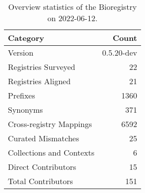 \begin{table}
\centering
\caption{Overview statistics of the Bioregistry on 2022-06-12.}
\label{tab:bioregistry-summary}
\begin{tabular}{lr}
\toprule
                Category &      Count \\
\midrule
                 Version & 0.5.20-dev \\
     Registries Surveyed &         22 \\
      Registries Aligned &         21 \\
                Prefixes &       1360 \\
                Synonyms &        371 \\
 Cross-registry Mappings &       6592 \\
      Curated Mismatches &         25 \\
Collections and Contexts &          6 \\
     Direct Contributors &         15 \\
      Total Contributors &        151 \\
\bottomrule
\end{tabular}
\end{table}
